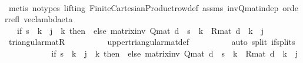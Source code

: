 \begin{isabellebody}
\ \ \ \ \ \ \ \ \isamarkupfalse%
\ {\isacharparenleft}{\kern0pt}metis\ {\isacharparenleft}{\kern0pt}no{\isacharunderscore}{\kern0pt}types{\isacharcomma}{\kern0pt}\ lifting{\isacharparenright}{\kern0pt}\ Finite{\isacharunderscore}{\kern0pt}Cartesian{\isacharunderscore}{\kern0pt}Product{\isachardot}{\kern0pt}row{\isacharunderscore}{\kern0pt}def\ assms\ inv{\isacharunderscore}{\kern0pt}Q{\isacharunderscore}{\kern0pt}mat{\isacharunderscore}{\kern0pt}indep\ order{\isacharunderscore}{\kern0pt}refl\ vec{\isacharunderscore}{\kern0pt}lambda{\isacharunderscore}{\kern0pt}eta{\isacharparenright}{\kern0pt}\isanewline
\ \ \ \ \ \ \isamarkupfalse%
\ \isamarkupfalse%
\ {\isachardoublequoteopen}{\isasymdots}\ {\isacharequal}{\kern0pt}\ {\isacharparenleft}{\kern0pt}if\ s\ {\isacharless}{\kern0pt}\ k\ {\isasymor}\ j\ {\isacharless}{\kern0pt}\ k\ then\ {}\ else\ {\isacharparenleft}{\kern0pt}matrix{\isacharunderscore}{\kern0pt}inv\ {\isacharparenleft}{\kern0pt}Q{\isacharunderscore}{\kern0pt}mat\ d{\isacharprime}{\kern0pt}{\isacharparenright}{\kern0pt}\ {\isachardollar}{\kern0pt}\ s\ {\isachardollar}{\kern0pt}\ k\ {\isacharasterisk}{\kern0pt}\ R{\isacharunderscore}{\kern0pt}mat\ d\ {\isachardollar}{\kern0pt}\ k\ {\isachardollar}{\kern0pt}\ j{\isacharparenright}{\kern0pt}{\isacharparenright}{\kern0pt}{\isachardoublequoteclose}\isanewline
\ \ \ \ \ \ \ \ \isamarkupfalse%
\ triangular{\isacharunderscore}{\kern0pt}mat{\isacharunderscore}{\kern0pt}R\isanewline
\ \ \ \ \ \ \ \ \isamarkupfalse%
\ upper{\isacharunderscore}{\kern0pt}triangular{\isacharunderscore}{\kern0pt}mat{\isacharunderscore}{\kern0pt}def\isanewline
\ \ \ \ \ \ \ \ \isamarkupfalse%
\ {\isacharparenleft}{\kern0pt}auto\ split{\isacharcolon}{\kern0pt}\ if{\isacharunderscore}{\kern0pt}splits{\isacharparenright}{\kern0pt}\isanewline
\ \ \ \ \ \ \isamarkupfalse%
\ \isamarkupfalse%
\ {\isachardoublequoteopen}{\isasymdots}\ {\isacharequal}{\kern0pt}\ {\isacharparenleft}{\kern0pt}if\ s\ {\isacharless}{\kern0pt}\ k\ {\isasymor}\ j\ {\isacharless}{\kern0pt}\ k\ then\ {}\ else\ {\isacharparenleft}{\kern0pt}matrix{\isacharunderscore}{\kern0pt}inv\ {\isacharparenleft}{\kern0pt}Q{\isacharunderscore}{\kern0pt}mat\ d{\isacharprime}{\kern0pt}{\isacharparenright}{\kern0pt}\ {\isachardollar}{\kern0pt}\ s\ {\isachardollar}{\kern0pt}\ k\ {\isacharasterisk}{\kern0pt}\ R{\isacharunderscore}{\kern0pt}mat\ d{\isacharprime}{\kern0pt}\ {\isachardollar}{\kern0pt}\ k\ {\isachardollar}{\kern0pt}\ j{\isacharparenright}{\kern0pt}{\isacharparenright}{\kern0pt}{\isachardoublequoteclose}\isanewline

\end{isabellebody}

